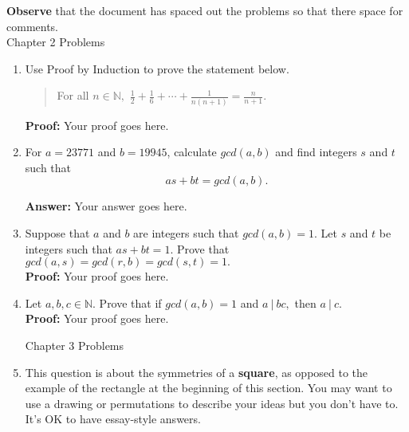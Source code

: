 \documentclass[12pt]{article}
\renewcommand{\emph}[1]{\textsf{\textbf{#1}}}
\newcommand{\bbN}{\mathbb{N}}
\begin{document}
\textbf{Observe} that the document has spaced out the problems so that there space for comments.\\

Chapter 2 Problems\\

\begin{enumerate}
\item Use Proof by Induction to prove the statement below.\\

\begin{quote} For all $n \in \bbN,$ $\displaystyle \frac{1}{2}+\frac{1}{6}+ \cdots + \frac{1}{n(n+1)}=\frac{n}{n+1}.$ \end{quote}

\textbf{Proof:} Your proof goes here.

\newpage

\item For $a=23771$ and $b=19945$, calculate $gcd(a,b)$ and find integers $s$ and $t$ such that 
$$as+bt=gcd(a,b).$$

\textbf{Answer:} Your answer goes here.

\newpage

\item Suppose that $a$ and $b$ are integers such that $gcd(a,b)=1.$ Let $s$ and $t$ be integers such that $as+bt=1.$ Prove that $gcd(a,s)=gcd(r,b)=gcd(s,t)=1.$\\

\textbf{Proof:} Your proof goes here.

\newpage

\item Let $a,b,c \in \bbN.$ Prove that if $gcd(a,b)=1$ and $a \: | \: bc,$ then $a \: | \: c.$\\

\textbf{Proof:} Your proof goes here.

\newpage

Chapter 3 Problems

\item This question is about the symmetries of a \emph{square}, as opposed to the example of the rectangle at the beginning of this section. You may want to use a drawing or permutations to describe your ideas but you don't have to. It's OK to have essay-style answers.\\



\end{enumerate}
\end{document}
